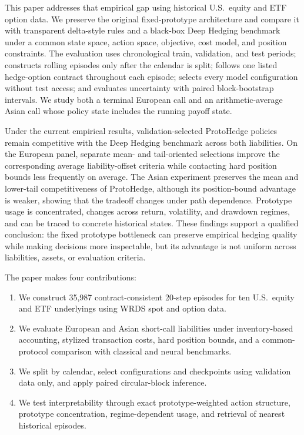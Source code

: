 \documentclass[sigconf]{acmart}
\begin{document}
This paper addresses that empirical gap using historical U.S.\ equity and ETF
option data. We preserve the original fixed-prototype architecture and compare
it with transparent delta-style rules and a black-box Deep Hedging benchmark
under a common state space, action space, objective, cost model, and position
constraints. The evaluation uses chronological train, validation, and test
periods; constructs rolling episodes only after the calendar is split; follows
one listed hedge-option contract throughout each episode; selects every model
configuration without test access; and evaluates uncertainty with paired
block-bootstrap intervals. We study both a terminal European call and an
arithmetic-average Asian call whose policy state includes the running payoff
state.

Under the current empirical results, validation-selected ProtoHedge policies
remain competitive with the Deep Hedging benchmark across both liabilities.
On the European panel, separate mean- and tail-oriented selections improve the
corresponding average liability-offset criteria while contacting hard position
bounds less frequently on average. The Asian experiment preserves the mean and
lower-tail competitiveness of ProtoHedge, although its position-bound advantage
is weaker, showing that the tradeoff changes under path dependence. Prototype
usage is concentrated, changes across return, volatility, and drawdown regimes,
and can be traced to concrete historical states. These findings support a
qualified conclusion: the fixed prototype bottleneck can preserve empirical
hedging quality while making decisions more inspectable, but its advantage is
not uniform across liabilities, assets, or evaluation criteria.

The paper makes four contributions:
\begin{enumerate}
    \item We construct 35,987 contract-consistent 20-step episodes for ten
    U.S.\ equity and ETF underlyings using WRDS spot and option data.
    \item We evaluate European and Asian short-call liabilities under
    inventory-based accounting, stylized transaction costs, hard position
    bounds, and a common-protocol comparison with classical and neural
    benchmarks.
    \item We split by calendar, select configurations and checkpoints using
    validation data only, and apply paired circular-block inference.
    \item We test interpretability through exact prototype-weighted action
    structure, prototype concentration, regime-dependent usage, and retrieval
    of nearest historical episodes.
\end{enumerate}
\end{document}
